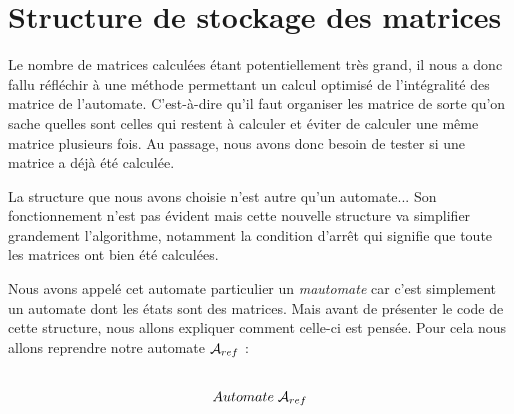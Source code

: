 \documentclass[12pt]{memoir}
\begin{document}
\section{Structure de stockage des matrices}


Le nombre de matrices calculées étant potentiellement très grand, il nous a
donc fallu réfléchir à une méthode permettant un calcul optimisé de
l'intégralité des matrice de l'automate. C'est-à-dire qu'il faut organiser les
matrice de sorte qu'on sache quelles sont celles qui restent à calculer et
éviter de calculer une même matrice plusieurs fois. Au passage, nous avons
donc besoin de tester si une matrice a déjà été calculée.

\bigskip
La structure que nous avons choisie n'est autre qu'un automate... Son
fonctionnement n'est pas évident mais cette nouvelle structure va simplifier
grandement l'algorithme, notamment la condition d'arrêt qui signifie que toute
les matrices ont bien été calculées.

Nous avons appelé cet automate particulier un \textit{mautomate} car c'est
simplement un automate dont les états sont des matrices. Mais avant de présenter le code de cette structure, nous allons expliquer comment celle-ci est pensée. Pour cela nous allons reprendre notre automate $\mathcal{A}_{ref}$ :\\\\

\begin{center}
\[ Automate\; \mathcal{A}_{ref}\]
\end{center}
$\ $\\
\end{document}
